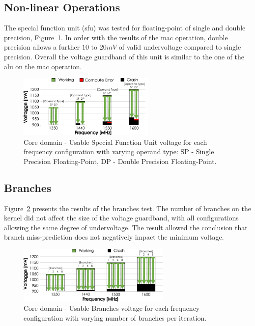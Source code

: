 \subsection{Non-linear Operations}

The special function unit (\acrshort{sfu}) was tested for floating-point of single and double precision, Figure~\ref{fig:SFU_guardband}. In order with the results of the \acrshort{mac} operation, double precision allows a further $10$ to $20mV$ of valid undervoltage compared to single precision. Overall the voltage guardband of this unit is similar to the one of the \acrshort{alu} on the \acrshort{mac} operation. 

\begin{figure}[htb]
  \centering
  \includegraphics[width=0.6\textwidth]{Figures/GPU_characterization/SFU_guardband.pdf}
  \caption{Core domain - Usable Special Function Unit voltage for each frequency configuration with varying operand type: SP - Single Precision Floating-Point, DP - Double Precision Floating-Point.}
  \label{fig:SFU_guardband}
\end{figure}

\subsection{Branches}


Figure~\ref{fig:Branches_guardband} presents the results of the branches test. The number of branches on the kernel did not affect the size of the voltage guardband, with all configurations allowing the same degree of undervoltage.
The result allowed the conclusion that branch miss-prediction does not negatively impact the minimum voltage.

\begin{figure}[htb]
  \centering
  \includegraphics[width=0.67\textwidth]{Figures/GPU_characterization/Branches_guardband.pdf}
  \caption{Core domain - Usable Branches voltage for each frequency configuration with varying number of branches per iteration.}
  \label{fig:Branches_guardband}
\end{figure}

